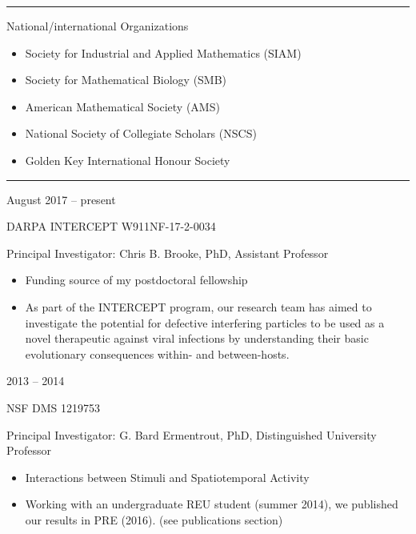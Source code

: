 \documentclass[a4paper,10pt]{article}
\newlength{\cvcolumngapwidth}
\newlength{\cvleftcolumnwidth}
\newlength{\cvrightcolumnwidth}
\newcommand{\cvsectionstyle}[1]{{\normalsize\cvsectionfont\textcolor{cvsectioncolor}{#1}}}
\newcommand{\cvtitlestyle}[1]{{\large\cvtitlefont\textcolor{cvtitlecolor}{#1}}}
\newcommand{\cvheadingstyle}[1]{{\normalsize\cvheadingfont\textcolor{cvheadingcolor}{#1}}}
\newlength{\cvafteritemskipamount}
\newlength{\cvaftersectionskipamount}
\newlength{\cvbetweensectionandheadingextraskipamount}
\newlength{\cvaftertitleskipamount}
\newlength{\cvparskip}
\newcommand{\cvsection}[1]{
    \begin{minipage}[t]{\cvleftcolumnwidth}
        \raggedleft\cvsectionstyle{#1}
    \end{minipage}%
    \hspace{\cvcolumngapwidth}%
    \begin{minipage}[t]{\cvrightcolumnwidth}
        \textcolor{cvrulecolor}{\rule{\cvrightcolumnwidth}{0.3mm}}
    \end{minipage}

    \vspace{\cvaftersectionskipamount}
}
\newcommand{\cvitem}[2]{
    \begin{minipage}[t]{\cvleftcolumnwidth}
        \raggedleft #1
    \end{minipage}%
    \hspace{\cvcolumngapwidth}%
    \begin{minipage}[t]{\cvrightcolumnwidth}
        \setlength{\parskip}{\cvparskip} #2
    \end{minipage}

    \vspace{\cvafteritemskipamount}
}
\newcommand{\cvtitle}[1]{
    \cvtitlestyle{#1}

    \vspace{\cvaftertitleskipamount}
    \vspace{-\cvparskip}
}
\begin{document}
\newpage
\cvsection{CURRENT PROFESSIONAL MEMBERSHIPS}

\cvitem{
    \cvheadingstyle{}
}{
    \cvtitle{National/international Organizations}
    \begin{itemize}[leftmargin=*]
        \item Society for Industrial and Applied Mathematics (SIAM) 
    	\item Society for Mathematical Biology (SMB)
        \item American Mathematical Society (AMS)
        \item National Society of Collegiate Scholars (NSCS)
        \item Golden Key International Honour Society
    \end{itemize}
    
}


%
%


\cvsection{FUNDING ACKNOWLEDGMENTS}
\vspace{\cvbetweensectionandheadingextraskipamount}

\cvitem{
    \cvheadingstyle{August 2017 -- present}
}{
    \cvtitle{DARPA INTERCEPT W911NF-17-2-0034} 
    Principal Investigator: Chris B. Brooke, PhD, Assistant Professor
    \begin{itemize}
	\item Funding source of my postdoctoral fellowship
    	\item As part of the INTERCEPT program, our research team has aimed to investigate the potential for defective interfering particles to be used as a novel therapeutic against viral infections by understanding their basic evolutionary consequences within- and between-hosts.
    \end{itemize}
    
}

\cvitem{
    \cvheadingstyle{2013 -- 2014}
}{
    \cvtitle{NSF DMS 1219753} 
    Principal Investigator: G. Bard Ermentrout, PhD, Distinguished University Professor
    \begin{itemize}
        \item Interactions between Stimuli and Spatiotemporal Activity
        \item Working with an undergraduate REU student (summer 2014), we published our results in PRE (2016). (see publications section) \\
    \end{itemize}
    
}
\end{document}
